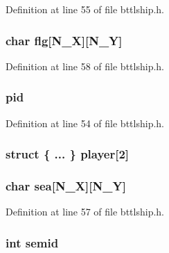 Definition at line 55 of file bttlship.h.

\hypertarget{struct_s___t_a_b_l_e_ad3bb0e8aada972de614d50a5069596b1}{
\subsubsection[{flg}]{\setlength{\rightskip}{0pt plus 5cm}char {\bf flg}\mbox{[}N\_\-X\mbox{]}\mbox{[}N\_\-Y\mbox{]}}}
\label{struct_s___t_a_b_l_e_ad3bb0e8aada972de614d50a5069596b1}


Definition at line 58 of file bttlship.h.

\hypertarget{struct_s___t_a_b_l_e_ae0d46a978d5cd6707411f276ad869b9c}{
\subsubsection[{pid}]{ {\bf pid}}}
\label{struct_s___t_a_b_l_e_ae0d46a978d5cd6707411f276ad869b9c}


Definition at line 54 of file bttlship.h.

\hypertarget{struct_s___t_a_b_l_e_a7f2737fd5784a77ca8c868b817c0ea0d}{
\subsubsection[{player}]{\setlength{\rightskip}{0pt plus 5cm}struct \{ ... \}         {\bf player}\mbox{[}2\mbox{]}}}
\label{struct_s___t_a_b_l_e_a7f2737fd5784a77ca8c868b817c0ea0d}
\hypertarget{struct_s___t_a_b_l_e_a6bee2a889a353271513547393b6a9779}{
\subsubsection[{sea}]{\setlength{\rightskip}{0pt plus 5cm}char {\bf sea}\mbox{[}N\_\-X\mbox{]}\mbox{[}N\_\-Y\mbox{]}}}
\label{struct_s___t_a_b_l_e_a6bee2a889a353271513547393b6a9779}


Definition at line 57 of file bttlship.h.

\hypertarget{struct_s___t_a_b_l_e_a7c35ac5305085cf7360645b8d52988b5}{
\subsubsection[{semid}]{\setlength{\rightskip}{0pt plus 5cm}int {\bf semid}}}
\label{struct_s___t_a_b_l_e_a7c35ac5305085cf7360645b8d52988b5}


